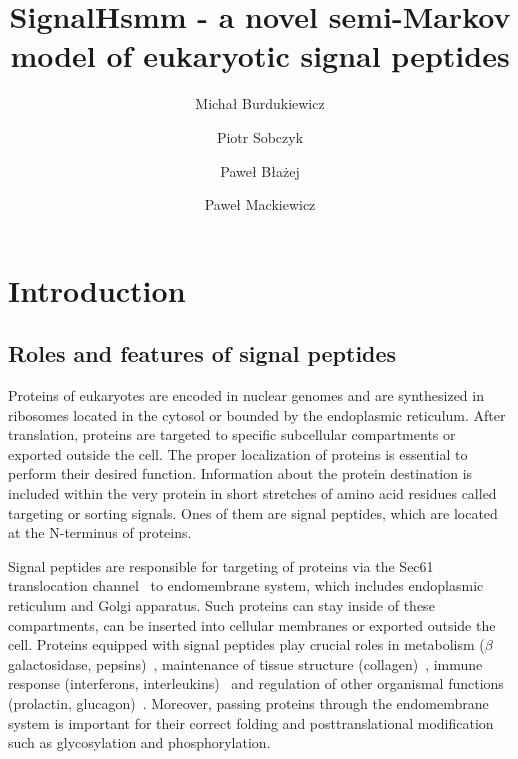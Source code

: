 \documentclass[fleqn,10pt,twoside]{gcb15submission}
\title{SignalHsmm - a novel semi-Markov model of eukaryotic signal peptides}
\author[1]{Micha\l{}  Burdukiewicz}
\author[2]{Piotr Sobczyk}
\author[1]{Pawe\l{} B\l{}a\.{z}ej}
\author[1]{Pawe\l{} Mackiewicz}
\affil[1]{University of Wroc\l{}aw, Department of Genomics, Poland}
\affil[2]{Wroc\l{}aw University of Technology, Department of Mathematics, Poland}
\begin{document}
\flushbottom
\maketitle
\thispagestyle{empty}


\section*{Introduction}

\subsection*{Roles and features of signal peptides}

Proteins of eukaryotes are encoded in nuclear genomes and are synthesized in ribosomes located in the cytosol or bounded by the endoplasmic reticulum. After translation, proteins are targeted to specific subcellular compartments or exported outside the cell. The proper localization of proteins is essential to perform their desired function. Information about the protein destination is included within the very protein in short stretches of amino acid residues called targeting or sorting signals. Ones of them are signal peptides, which are located at the N-terminus of proteins.

Signal peptides are responsible for targeting of proteins via the Sec61 translocation channel~\citep{2007rapoportprotein} to endomembrane system, which includes endoplasmic reticulum and Golgi apparatus. Such proteins can stay inside of these compartments, can be inserted into cellular membranes or exported outside the cell. Proteins equipped with signal peptides play crucial roles in metabolism ($\beta$ galactosidase, pepsins)~\citep{1991hofmannmutations}, maintenance of tissue structure (collagen)~\citep{2001chanaberrant}, immune response (interferons, interleukins)~\citep{2005zhangalteration} and regulation of other organismal functions (prolactin, glucagon)~\citep{2010huangrole}. Moreover, passing proteins through the endomembrane system is important for their correct folding and posttranslational modification such as glycosylation and phosphorylation.
\end{document}
